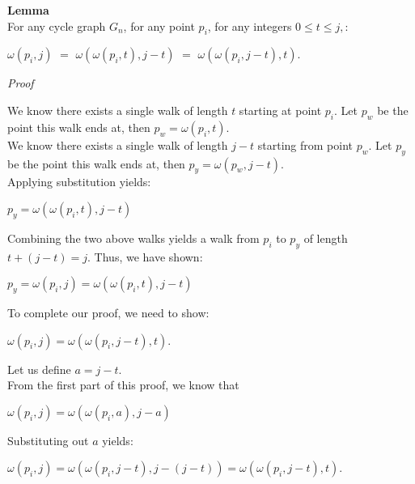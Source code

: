 \documentclass[a4paper,12pt]{article}
\begin{document}
\label{lemma:composition_of_sub_walks}
\hypertarget{lemma:composition_of_sub_walks}{}
\begin{tcolorbox}
\textbf{Lemma}\\
For any cycle graph $G_n$, for any point $p_i$, for any integers $0 \leq t \leq j,$:
\begin{center}
$\omega(p_i, j)$ $=$ $\omega(\omega(p_i, t), j - t)$ $=$ $\omega(\omega(p_i, j - t), t)$. 
\end{center}
\end{tcolorbox}

\noindent
\textit{Proof}

\noindent We know there exists a single walk of length $t$ starting at point $p_i$.
Let $p_w$ be the point this walk ends at, then $p_w = \omega(p_i, t)$.\\

\noindent We know there exists a single walk of length $j - t$ starting from point $p_w$.
Let $p_y$ be the point this walk ends at, then $p_y = \omega(p_w, j - t)$.\\
Applying substitution yields:

\begin{center}
$p_y = \omega(\omega(p_i, t), j - t)$
\end{center}

\noindent Combining the two above walks yields a walk from $p_i$ to $p_y$ of length\\
$t + (j - t) = j$. Thus, we have shown:
\begin{center}
$p_y = \omega(p_i, j) = \omega(\omega(p_i, t), j - t)$
\end{center}

\noindent To complete our proof, we need to show:
\begin{center}
$\omega(p_i, j) = \omega(\omega(p_i, j - t), t)$.
\end{center}

\noindent Let us define $a = j - t$.\\

\noindent From the first part of this proof, we know that
\begin{center}
$\omega(p_i, j) = \omega(\omega(p_i, a), j - a)$
\end{center}

\noindent Substituting out $a$ yields:
\begin{center}
$\omega(p_i, j) = \omega(\omega(p_i, j - t), j - (j - t)) = \omega(\omega(p_i, j - t), t)$.
\end{center}
\end{document}
